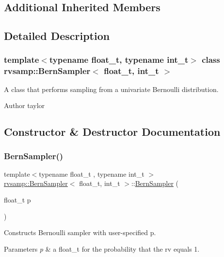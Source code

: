 \subsection*{Additional Inherited Members}


\subsection{Detailed Description}
\subsubsection*{template$<$typename float\+\_\+t, typename int\+\_\+t$>$\newline
class rvsamp\+::\+Bern\+Sampler$<$ float\+\_\+t, int\+\_\+t $>$}

A class that performs sampling from a univariate Bernoulli distribution. 

\begin{DoxyAuthor}{Author}
taylor 
\end{DoxyAuthor}


\subsection{Constructor \& Destructor Documentation}
\mbox{\label{classrvsamp_1_1BernSampler_a2cc92da7edf3b4348e01e7a1cab59fe2}} 
\subsubsection{\texorpdfstring{Bern\+Sampler()}{BernSampler()}}
{\footnotesize\ttfamily template$<$typename float\+\_\+t , typename int\+\_\+t $>$ \\
\hyperlink{classrvsamp_1_1BernSampler}{rvsamp\+::\+Bern\+Sampler}$<$ float\+\_\+t, int\+\_\+t $>$\+::\hyperlink{classrvsamp_1_1BernSampler}{Bern\+Sampler} (\begin{DoxyParamCaption}\item[{float\+\_\+t}]{p }\end{DoxyParamCaption})}



Constructs Bernoulli sampler with user-\/specified p. 


\begin{DoxyParams}{Parameters}
{\em p} & a float\+\_\+t for the probability that the rv equals 1. \\
\hline
\end{DoxyParams}


